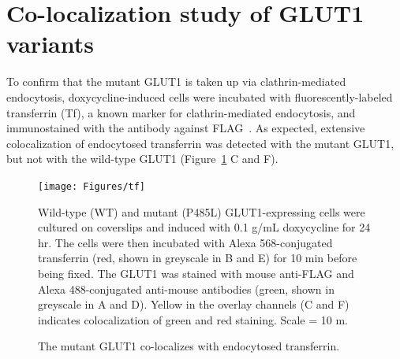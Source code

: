 \section{Co-localization study of GLUT1 variants}
To confirm that the mutant GLUT1 is taken up via clathrin-mediated endocytosis, doxycycline-induced cells were incubated with fluorescently-labeled transferrin (Tf), a known marker for clathrin-mediated endocytosis, and immunostained with the antibody against FLAG~\cite{Hanover}. As expected, extensive colocalization of endocytosed transferrin was detected with the mutant GLUT1, but not with the wild-type GLUT1 (Figure~\ref{fig:tf} C and F).
\begin{figure}[h]
\centering
\texttt{[image: Figures/tf]}
\caption{The mutant GLUT1 co-localizes with endocytosed transferrin.}
\vspace*{-3mm}
\small \justify
Wild-type (WT) and mutant (P485L) GLUT1-expressing cells were cultured on coverslips and induced with 0.1 \textmu g/mL doxycycline for 24 hr. The cells were then incubated with Alexa 568-conjugated transferrin (red, shown in greyscale in B and E) for 10 min before being fixed. The GLUT1 was stained with mouse anti-FLAG and Alexa 488-conjugated anti-mouse antibodies (green, shown in greyscale in A and D). Yellow in the overlay channels (C and F) indicates colocalization of green and red staining. Scale = 10 \textmu m.
\label{fig:tf}
\end{figure}

